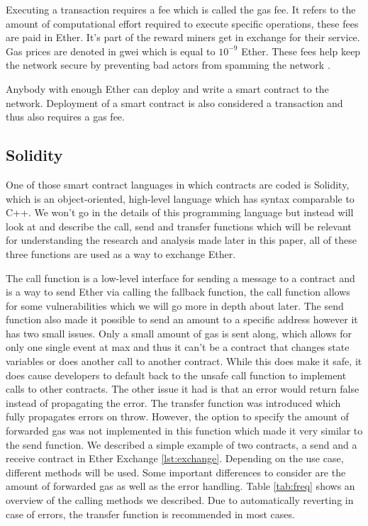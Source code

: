 \documentclass[sigconf]{acmart}
\begin{document}
Executing a transaction requires a fee which is called the gas fee. It refers to the amount of computational effort required to execute specific operations, these fees are paid in Ether. It's part of the reward miners get in exchange for their service. Gas prices are denoted in gwei which is equal to $10^{-9}$ Ether. These fees help keep the network secure by preventing bad actors from spamming the network \cite{docs}.

Anybody with enough Ether can deploy and write a smart contract to the network. Deployment of a smart contract is also considered a transaction and thus also requires a gas fee.
\subsection{Solidity}
One of those smart contract languages in which contracts are coded is Solidity, which is an object-oriented, high-level language which has syntax comparable to C++. We won't go in the details of this programming language but instead will look at and describe the call, send and transfer functions which will be relevant for understanding the research and analysis made later in this paper, all of these three functions are used as a way to exchange Ether.

The call function is a low-level interface for sending a message to a contract and is a way to send Ether via calling the fallback function, the call function allows for some vulnerabilities which we will go more in depth about later. The send function also made it possible to send an amount to a specific address however it has two small issues. Only a small amount of gas is sent along, which allows for only one single event at max and thus it can't be a contract that changes state variables or does another call to another contract. While this does make it safe, it does cause developers to default back to the unsafe call function to implement calls to other contracts. The other issue it had is that an error would return false instead of propagating the error. The transfer function was introduced which fully propagates errors on throw. However, the option to specify the amount of forwarded gas was not implemented in this function which made it very similar to the send function. We described a simple example of two contracts, a send and a receive contract in Ether Exchange \ref{lst:exchange}.
Depending on the use case, different methods will be used. Some important differences to consider are the amount of forwarded gas as well as the error handling. Table \ref{tab:freq} shows an overview of the calling methods we described. Due to automatically reverting in case of errors, the transfer function is recommended in most cases. 
\end{document}

